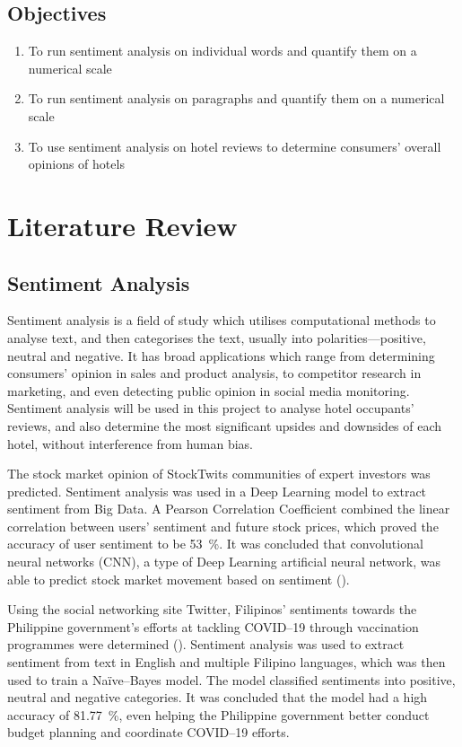 \documentclass[
	fontsize=12pt,
	paper=a4,
	bibliography=totocnumbered
]{scrartcl}
\begin{document}
\subsection{Objectives}
\begin{enumerate}
	\item To run sentiment analysis on individual words and quantify them on a numerical scale
	\item To run sentiment analysis on paragraphs and quantify them on a numerical scale
	\item To use sentiment analysis on hotel reviews to determine consumers' overall opinions of hotels
\end{enumerate}

\section{Literature Review}

\subsection{Sentiment Analysis}

Sentiment analysis is a field of study which utilises computational methods to analyse text,
and then categorises the text, usually into polarities---positive, neutral
and negative. It has broad applications which range from determining consumers' opinion in
sales and product analysis, to competitor research in marketing, and even detecting public
opinion in social media monitoring. Sentiment analysis will be used in this project to
analyse hotel occupants' reviews, and also determine the most significant upsides
and downsides of each hotel, without interference from human bias.

The stock market opinion of StockTwits communities
of expert investors was predicted. Sentiment analysis was used in a Deep Learning model to extract
sentiment from Big Data. A Pearson Correlation Coefficient combined the linear correlation
between users' sentiment and future stock prices, which
proved the accuracy of user sentiment to be \qty{53}{\percent}.
It was concluded that convolutional neural networks (CNN), a type of Deep Learning
artificial neural network, was able to predict stock market movement based on sentiment (\cite{stock}).

Using the social networking site Twitter,
Filipinos' sentiments towards the Philippine government's efforts
at tackling COVID--19 through vaccination programmes were determined (\cite{twitter}).
Sentiment analysis was used to extract sentiment from text in English and multiple Filipino languages,
which was then used to train a Na{\"i}ve--Bayes model. The model classified
sentiments into positive, neutral and negative categories. It was concluded that
the model had a high accuracy of \qty{81.77}{\percent}, even helping the
Philippine government better conduct budget planning and coordinate COVID--19 efforts.
\end{document}
